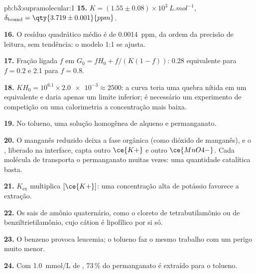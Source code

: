 \begin{solution}{pb:b3:supramolecular:1}
\textbf{15.} $K = (1.55 \pm 0.08) \times 10^3\ \unit{L.mol^{-1}}$, $\delta_{\mathrm{bound}} = \qty{3.719 \pm 0.001}{ppm}$.

\textbf{16.} O resíduo quadrático médio é de \qty{0.0014}{ppm}, da ordem da precisão de
leitura, sem tendência: o modelo 1:1 se ajusta.

\textbf{17.} Fração ligada $f$ em $G_0 = fH_0 + f/(K(1 - f))$: 0.28 equivalente para $f = 0.2$ e 2.1 para $f = 0.8$.

\textbf{18.} $KH_0 = 10^{6.1} \times \num{2.0e-3} \approx 2500$: a curva teria uma quebra nítida em um equivalente
e daria apenas um limite inferior; é necessário um experimento de competição ou uma calorimetria a
concentração mais baixa.

\textbf{19.} No tolueno, uma solução homogênea de alqueno e permanganato.

\textbf{20.} O manganês reduzido deixa a fase orgânica (como dióxido de manganês),
e o , liberado na interface, capta outro $\ce{K+}$ e outro $\ce{MnO4-}$. Cada molécula de
 transporta o permanganato muitas vezes: uma quantidade catalítica basta.

\textbf{21.} $K_{\mathrm{ex}}$ multiplica $[\ce{K+}]$: uma concentração alta de potássio favorece a extração.

\textbf{22.} Os sais de amônio quaternário, como o cloreto de tetrabutilamônio ou de
benziltrietilamônio, cujo cátion é lipofílico por si só.

\textbf{23.} O benzeno provoca leucemia; o tolueno faz o mesmo trabalho com um perigo muito
menor.

\textbf{24.} Com \qty{1.0}{mmol/L} de , 73\,\% do permanganato é extraído para o
tolueno.
\end{solution}
